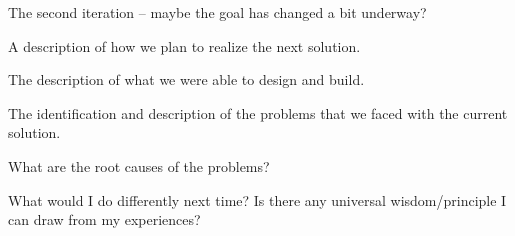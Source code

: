 \iteration
The second iteration – maybe the goal has changed a bit underway? 

\plan
A description of how we plan to realize the next solution. 

\results 
The description of what we were able to design and build. 

\problems
The identification and description of the problems that we faced with the current solution. 

\diagnosis
What are the root causes of the problems? 

\principles
What would I do differently next time? Is there any universal wisdom/principle I can draw from my experiences? 